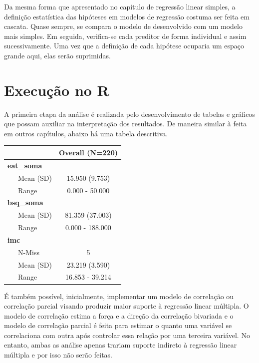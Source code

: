 \documentclass[
]{book}
\newenvironment{Shaded}{\begin{snugshade}}{\end{snugshade}}
\newcommand{\KeywordTok}[1]{\textcolor[rgb]{0.13,0.29,0.53}{\textbf{#1}}}
\newcommand{\NormalTok}[1]{#1}
\newcommand{\OperatorTok}[1]{\textcolor[rgb]{0.81,0.36,0.00}{\textbf{#1}}}
\newcommand{\StringTok}[1]{\textcolor[rgb]{0.31,0.60,0.02}{#1}}
\begin{document}
Da mesma forma que apresentado no capítulo de regressão linear simples, a definição estatística das hipóteses em modelos de regressão costuma ser feita em cascata. Quase sempre, se compara o modelo de desenvolvido com um modelo mais simples. Em seguida, verifica-se cada preditor de forma individual e assim sucessivamente. Uma vez que a definição de cada hipótese ocuparia um espaço grande aqui, elas serão suprimidas.

\hypertarget{execuuxe7uxe3o-no-r-7}{%
\section{Execução no R}\label{execuuxe7uxe3o-no-r-7}}

A primeira etapa da análise é realizada pelo desenvolvimento de tabelas e gráficos que possam auxiliar na interpretação dos resultados. De maneira similar à feita em outros capítulos, abaixo há uma tabela descritiva.

\begin{Shaded}
\end{Shaded}

\begin{longtable}[]{@{}lc@{}}
\toprule
& Overall (N=220)\tabularnewline
\midrule
\endhead
\textbf{eat\_soma} &\tabularnewline
~~~Mean (SD) & 15.950 (9.753)\tabularnewline
~~~Range & 0.000 - 50.000\tabularnewline
\textbf{bsq\_soma} &\tabularnewline
~~~Mean (SD) & 81.359 (37.003)\tabularnewline
~~~Range & 0.000 - 188.000\tabularnewline
\textbf{imc} &\tabularnewline
~~~N-Miss & 5\tabularnewline
~~~Mean (SD) & 23.219 (3.590)\tabularnewline
~~~Range & 16.853 - 39.214\tabularnewline
\bottomrule
\end{longtable}

É também possível, inicialmente, implementar um modelo de correlação ou correlação parcial visando produzir maior suporte à regressão linear múltipla. O modelo de correlação estima a força e a direção da correlação bivariada e o modelo de correlação parcial é feita para estimar o quanto uma variável se correlaciona com outra após controlar essa relação por uma terceira variável. No entanto, ambas as análise apenas trariam suporte indireto à regressão linear múltipla e por isso não serão feitas.
\end{document}
